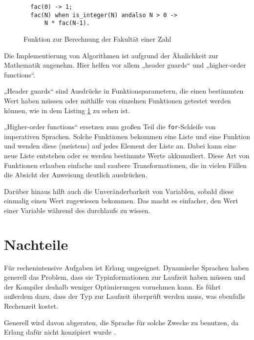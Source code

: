 \medskip
\renewcommand{\figurename}{Listing}
\begin{figure}[ht]
  \centering
  \begin{lstlisting}
  fac(0) -> 1;
  fac(N) when is_integer(N) andalso N > 0 ->
      N * fac(N-1).
    \end{lstlisting}
    \caption{\label{lst:fac} Funktion zur Berechnung der Fakultät einer Zahl}
\end{figure}
\renewcommand{\figurename}{Abbildung}


Die Implementierung von Algorithmen ist aufgrund der Ähnlichkeit zur
Mathematik angenehm.  Hier helfen vor allem „header guards“ und
„higher-order functions“.

„Header guards“ sind Ausdrücke in Funktionsparametern, die einen
bestimmten Wert haben müssen oder mithilfe von einzelnen Funktionen
getestet werden können, wie in dem Listing \ref{lst:fac} zu sehen ist.

„Higher-order functions“ ersetzen zum großen Teil die
\lstinline!for!-Schleife von imperativen Sprachen.  Solche Funktionen
bekommen eine Liste und eine Funktion und wenden diese (meistens) auf
jedes Element der Liste an.  Dabei kann eine neue Liste entstehen oder
es werden bestimmte Werte akkumuliert.  Diese Art von Funktionen
erlauben einfache und saubere Transformationen, die in vielen Fällen
die Absicht der Anweisung deutlich ausdrücken.

Darüber hinaus hilft auch die Unveränderbarkeit von Variablen, sobald
diese einmalig einen Wert zugewiesen bekommen.  Das macht es
einfacher, den Wert einer Variable während des durchlaufs zu wissen.

\section{Nachteile}
\label{sec:disadv}
Für rechenintensive Aufgaben ist Erlang ungeeignet.  Dynamische
Sprachen haben generell das Problem, dass sie Typinformationen zur
Laufzeit haben müssen und der Kompiler deshalb weniger Optimierungen
vornehmen kann.  Es führt außerdem dazu, dass der Typ zur Laufzeit
überprüft werden muss, was ebenfalls Rechenzeit kostet.

Generell wird davon abgeraten, die Sprache für solche Zwecke zu
benutzen, da Erlang dafür nicht konzipiert wurde
\cite[Kapitel~3]{lyse}.

\subsection{\gtwght}
\label{subsec:get-weight}

